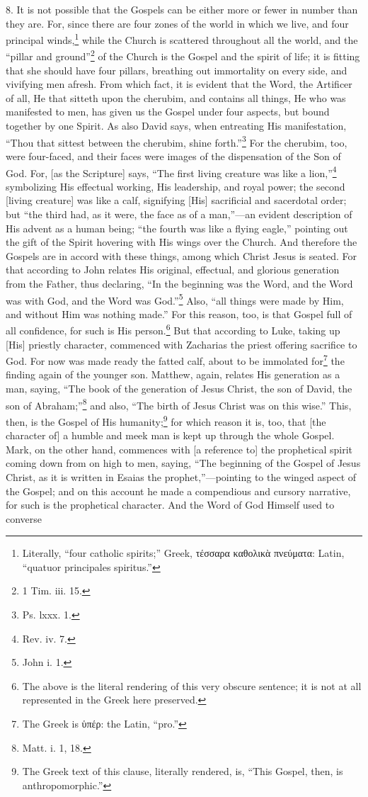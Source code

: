 8. It is not possible that the Gospels can be either more or fewer in number than they are. For, since there are four zones of the world in which we live, and four principal winds,\footnote{Literally, “four catholic spirits;” Greek, \textgreek{τέσσαρα καθολικὰ πνεύματα}: Latin, “quatuor principales spiritus.”} while the Church is scattered throughout all the world, and the “pillar and ground”\footnote{1 Tim. iii. 15.} of the Church is the Gospel and the spirit of life; it is fitting that she should have four pillars, breathing out immortality on every side, and vivifying men afresh. From which fact, it is evident that the Word, the Artificer of all, He that sitteth upon the cherubim, and contains all things, He who was manifested to men, has given us the Gospel under four aspects, but bound together by one Spirit. As also David says, when entreating His manifestation, “Thou that sittest between the cherubim, shine forth.”\footnote{Ps. lxxx. 1.} For the cherubim, too, were four-faced, and their faces were images of the dispensation of the Son of God. For, [as the Scripture] says, “The first living creature was like a lion,”\footnote{Rev. iv. 7.} symbolizing His effectual working, His leadership, and royal power; the second [living creature] was like a calf, signifying [His] sacrificial and sacerdotal order; but “the third had, as it were, the face as of a man,”—an evident description of His advent as a human being; “the fourth was like a flying eagle,” pointing out the gift of the Spirit hovering with His wings over the Church. And therefore the Gospels are in accord with these things, among which Christ Jesus is seated. For that according to John relates His original, effectual, and glorious generation from the Father, thus declaring, “In the beginning was the Word, and the Word was with God, and the Word was God.”\footnote{John i. 1.} Also, “all things were made by Him, and without Him was nothing made.” For this reason, too, is that Gospel full of all confidence, for such is His person.\footnote{The above is the literal rendering of this very obscure sentence; it is not at all represented in the Greek here preserved.} But that according to Luke, taking up [His] priestly character, commenced with Zacharias the priest offering sacrifice to God. For now was made ready the fatted calf, about to be immolated for\footnote{The Greek is \textgreek{ὑπέρ}: the Latin, “pro.”} the finding again of the younger son. Matthew, again, relates His generation as a man, saying, “The book of the generation of Jesus Christ, the son of David, the son of Abraham;”\footnote{Matt. i. 1, 18.} and also, “The birth of Jesus Christ was on this wise.” This, then, is the Gospel of His humanity;\footnote{The Greek text of this clause, literally rendered, is, “This Gospel, then, is anthropomorphic.”} for which reason it is, too, that [the character of] a humble and meek man is kept up through the whole Gospel. Mark, on the other hand, commences with [a reference to] the prophetical spirit coming down from on high to men, saying, “The beginning of the Gospel of Jesus Christ, as it is written in Esaias the prophet,”—pointing to the winged aspect of the Gospel; and on this account he made a compendious and cursory narrative, for such is the prophetical character. And the Word of God Himself used to converse 